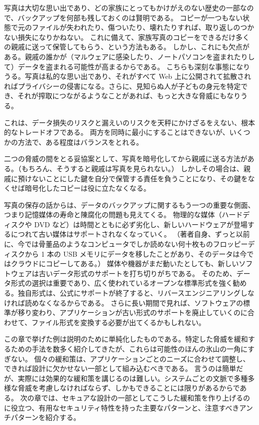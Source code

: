 \documentclass[uplatex]{jsarticle}
\def\label#1{}%
\begin{document}
\begin{exa}[家族写真のバックアップ]\label{exa:ch3-family-photos}
写真は大切な思い出であり、どの家族にとってもかけがえのない歴史の一部なので、バックアップを何部も残しておくのは賢明である。
コピーが一つもない状態で元のファイルが失われたり、傷ついたり、壊れたりすれば、取り返しのつかない損失になりかねない。
これに備えて、家族写真のコピーをできるだけ多くの親戚に送って保管してもらう、という方法もある。
しかし、これにも欠点がある。親戚の誰かが（マルウェアに感染したり、ノートパソコンを盗まれたりして）データを盗まれる可能性が高まるからである。
こちらも深刻な事態になりうる。写真は私的な思い出であり、それがすべて Web 上に公開されて拡散されればプライバシーの侵害になる。さらに、見知らぬ人が子どもの身元を特定でき、それが搾取につながるようなことがあれば、もっと大きな脅威にもなりうる。

これは、データ損失のリスクと漏えいのリスクを天秤にかけざるをえない、根本的なトレードオフである。
両方を同時に最小にすることはできないが、いくつかの方法で、ある程度はバランスをとれる。

二つの脅威の間をとる妥協案として、写真を暗号化してから親戚に送る方法がある。（もちろん、そうすると親戚は写真を見られない。）
しかしその場合は、親戚に預けないことにした鍵を自分で保管する責任を負うことになり、その鍵をなくせば暗号化したコピーは役に立たなくなる。
\end{exa}

写真の保存の話からは、データのバックアップに関するもう一つの重要な側面、つまり記憶媒体の寿命と陳腐化の問題も見えてくる。
物理的な媒体（ハードディスクや DVD など）は時間とともに必ず劣化し、新しいハードウェアが登場するにつれて古い媒体はサポートされなくなっていく。
（著者自身、ずっと以前に、今では骨董品のようなコンピュータでしか読めない何十枚ものフロッピーディスクから 1 本の USB メモリにデータを移したことがあり、そのデータは今ではクラウドにコピーしてある。）
媒体や機器がまだ動いたとしても、新しいソフトウェアは古いデータ形式のサポートを打ち切りがちである。
そのため、データ形式の選択は重要であり、広く使われているオープンな標準形式を強く勧める。独自形式は、公式にサポートが終了すると、リバースエンジニアリングしなければ読めなくなるからである。
さらに長い期間で見れば、ソフトウェアの標準が移り変わり、アプリケーションが古い形式のサポートを廃止していくのに合わせて、ファイル形式を変換する必要が出てくるかもしれない。

この章で挙げた例は説明のために単純化したものである。特定した脅威を緩和するための手法を数多く紹介してきたが、これらは可能性のほんの氷山の一角にすぎない。
個々の緩和策は、アプリケーションごとのニーズに合わせて調整し、できれば設計に欠かせない一部として組み込むべきである。
言うのは簡単だが、実際には効果的な緩和策を講じるのは難しい。システムごとの文脈で多種多様な脅威を考慮しなければならず、しかもできることには限りがあるからである。
次の章では、セキュアな設計の一部としてこうした緩和策を作り上げるのに役立つ、有用なセキュリティ特性を持った主要なパターンと、注意すべきアンチパターンを紹介する。
\end{document}
